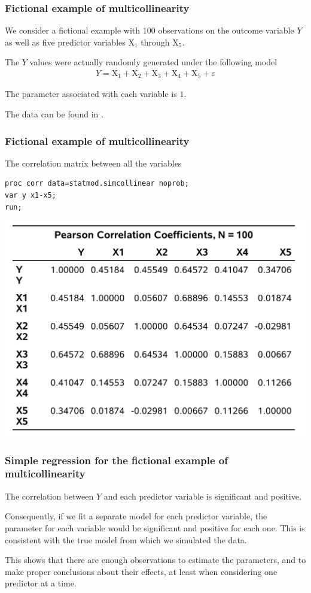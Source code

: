 \documentclass{beamer}
\begin{document}
\begin{frame}
\frametitle{Fictional example of multicollinearity}
\bi
\item We consider a fictional example with 100 observations on the outcome variable
$Y$ as well as five predictor variables $\mathrm{X}_1$ through $\mathrm{X}_5$. 

\item  The $Y$ values were actually randomly generated under the following model
\begin{align*}
Y=\mathrm{X}_1+\mathrm{X}_2+\mathrm{X}_3+\mathrm{X}_4+\mathrm{X}_5+\varepsilon
\end{align*}
\item The parameter associated with each variable is $1$.
\item The data can be found in .
\ei
\end{frame}

\begin{frame}[fragile]
\frametitle{Fictional example of multicollinearity}
\bi
\item The correlation matrix between all the variables
\vp \vp
\begin{tcolorbox}[colback=white,colframe=hecblue,title=\SASlang code for correlation]
\begin{verbatim}
proc corr data=statmod.simcollinear noprob;
var y x1-x5;
run;
\end{verbatim}
\end{tcolorbox}
\begin{center}
\includegraphics[width= 0.6\linewidth]{img/c2/slides3-e24}
\end{center}
\ei
\end{frame}

\begin{frame}[fragile]
\frametitle{Simple regression for the fictional example of multicollinearity}
\bi
\item The correlation between $Y$ and each predictor variable is significant and positive. 
\item Consequently, if we fit a separate model for each predictor variable, the parameter for each variable would be significant and positive for each one. This is consistent with the true model from which we simulated the data. 
\item This shows that there are enough observations to estimate the parameters, and to make proper conclusions about their effects, at least when considering one predictor at a time.
\ei
\end{frame}
\end{document}
